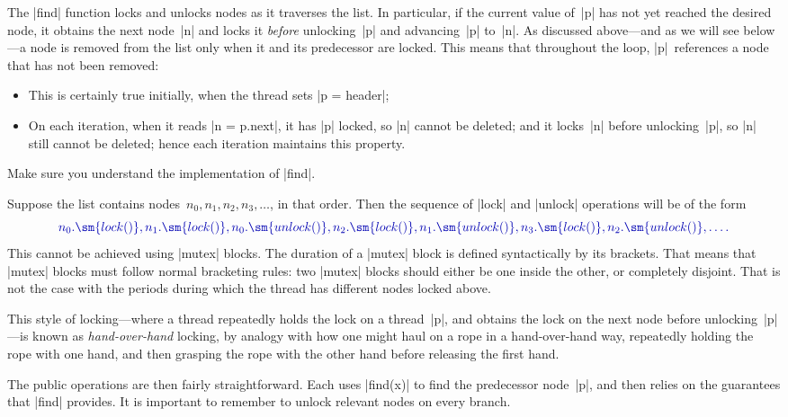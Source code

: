 The |find| function locks and unlocks nodes as it traverses the list.  In
particular, if the current value of~|p| has not yet reached the desired node,
it obtains the next node~|n| and locks it \emph{before} unlocking~|p| and
advancing~|p| to~|n|.  As discussed above---and as we will see below---a node
is removed from the list only when it and its predecessor are locked.  This
means that throughout the loop, |p|~references a node that has not been
removed:
% 
\begin{itemize}
\item This is certainly true initially, when the thread sets |p = header|;

\item On each iteration, when it reads |n = p.next|, it has |p| locked, so |n|
  cannot be deleted; and it locks~|n| before unlocking~|p|, so |n| still
  cannot be deleted; hence each iteration maintains this property.
\end{itemize}

\begin{instruction}
Make sure you understand the implementation of |find|.
\end{instruction}

Suppose the list contains nodes~$n_0, n_1, n_2, n_3, \ldots$, in that order.
Then the sequence of |lock| and |unlock| operations will be of the form
\[\mstyle
n_0.\sm{lock()}, n_1.\sm{lock()}, n_0.\sm{unlock()}, n_2.\sm{lock()},
n_1.\sm{unlock()}, n_3.\sm{lock()}, n_2.\sm{unlock()}, \ldots.
\]
This cannot be achieved using |mutex| blocks.  The duration of a |mutex| block
is defined syntactically by its brackets.  That means that |mutex| blocks must
follow normal bracketing rules: two |mutex| blocks should either be one inside
the other, or completely disjoint.  That is not the case with the periods
during which the thread has different nodes locked above.

This style of locking---where a thread repeatedly holds the lock on a
thread~|p|, and obtains the lock on the next node before unlocking~|p|---is
known as \emph{hand-over-hand} locking, by analogy with how one might haul on
a rope in a hand-over-hand way, repeatedly holding the rope with one hand, and
then grasping the rope with the other hand before releasing the first hand.

The public operations are then fairly straightforward.  Each uses |find(x)| to
find the predecessor node~|p|, and then relies on the guarantees that |find|
provides.  It is important to remember to unlock relevant nodes on every
branch. 

